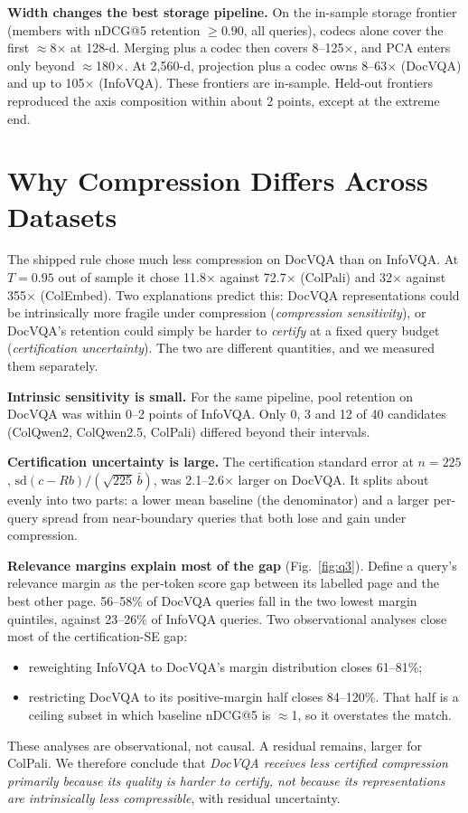 \documentclass[conference]{IEEEtran}
\begin{document}
\textbf{Width changes the best storage pipeline.} On the in-sample storage frontier
(members with nDCG@5 retention $\ge 0.90$, all queries),
codecs alone cover the first $\approx$8$\times$ at 128-d. Merging plus a codec then
covers 8--125$\times$, and PCA enters only beyond $\approx$180$\times$. At 2,560-d,
projection plus a codec owns 8--63$\times$ (DocVQA) and up to 105$\times$ (InfoVQA). These
frontiers are in-sample. Held-out frontiers reproduced the axis composition within about
2 points, except at the extreme end.

\section{Why Compression Differs Across Datasets}
\label{sec:datasets}

The shipped rule chose much less compression on DocVQA than on InfoVQA. At $T=0.95$ out
of sample it chose 11.8$\times$ against 72.7$\times$ (ColPali) and 32$\times$ against
355$\times$ (ColEmbed). Two explanations predict this: DocVQA representations could be
intrinsically more fragile under compression (\emph{compression sensitivity}), or
DocVQA's retention could simply be harder to \emph{certify} at a fixed query budget
(\emph{certification uncertainty}). The two are different quantities, and we measured
them separately.

\textbf{Intrinsic sensitivity is small.} For the same pipeline, pool retention on DocVQA
was within 0--2 points of InfoVQA. Only 0, 3 and 12 of 40 candidates
(ColQwen2, ColQwen2.5, ColPali) differed beyond their intervals.

\textbf{Certification uncertainty is large.} The certification standard error at
$n=225$, $\mathrm{sd}(c-Rb)/(\sqrt{225}\,\bar b)$, was 2.1--2.6$\times$ larger on DocVQA.
It splits about evenly into two parts: a lower mean baseline (the denominator) and a
larger per-query spread from near-boundary queries that both lose and gain under
compression.

\textbf{Relevance margins explain most of the gap} (Fig.~\ref{fig:q3}). Define a query's
relevance margin as the per-token score gap between its labelled page and the best other
page. 56--58\% of DocVQA queries fall in the two lowest margin quintiles, against
23--26\% of InfoVQA queries. Two observational analyses close most of the
certification-SE gap:
\begin{itemize}
\item reweighting InfoVQA to DocVQA's margin distribution closes 61--81\%;
\item restricting DocVQA to its positive-margin half closes 84--120\%. That half is a
ceiling subset in which baseline nDCG@5 is $\approx$1, so it overstates the match.
\end{itemize}
These analyses are observational, not causal. A residual remains, larger for ColPali.
We therefore conclude that \emph{DocVQA receives less certified compression primarily
because its quality is harder to certify, not because its representations are
intrinsically less compressible}, with residual uncertainty.
\end{document}
